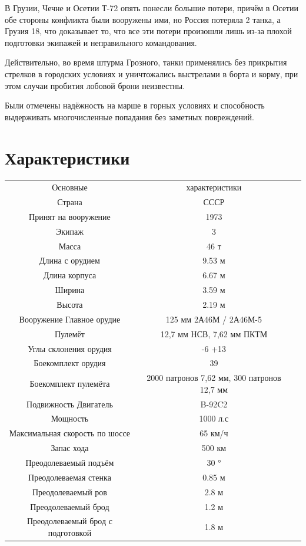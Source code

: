 В Грузии, Чечне и Осетии Т-72 опять понесли большие потери, причём в Осетии обе стороны конфликта были вооружены ими, но Россия потеряла 2 танка, а Грузия 18, что доказывает то, что все эти потери произошли лишь из-за плохой подготовки экипажей и неправильного командования.

Действительно, во время штурма Грозного, танки применялись без прикрытия стрелков в городских условиях и уничтожались выстрелами в борта и корму, при этом случаи пробития лобовой брони неизвестны.

Были отмечены надёжность на марше в горных условиях и способность выдерживать многочисленные попадания без заметных повреждений.

\section{Характеристики}

\begin{center}
\begin{tabular}{ccc}
	Основные & характеристики \\
	Страна & СССР \\
	Принят на вооружение & 1973 \\
	Экипаж & 3 \\
	Масса &	46 т \\
	Длина с орудием & 9.53 м \\
	Длина корпуса & 6.67 м \\
	Ширина & 3.59 м \\
	Высота & 2.19 м \\
	Вооружение Главное орудие & 125 мм 2А46М / 2А46М-5 \\
	Пулемёт & 12,7 мм НСВ, 7,62 мм ПКТМ \\
	Углы склонения орудия & -6 +13 \\
	Боекомплект орудия & 39 \\
	Боекомплект пулемёта & 2000 патронов 7,62 мм, 300 патронов 12,7 мм \\
	Подвижность Двигатель & B-92C2 \\
	Мощность & 1000 л.с \\
	Максимальная скорость по шоссе & 65 км/ч \\
	Запас хода & 500 км \\
	Преодолеваемый подъём & 30 ° \\
	Преодолеваемая стенка & 0.85 м \\
	Преодолеваемый ров & 2.8 м \\
	Преодолеваемый брод & 1.2 м \\
	Преодолеваемый брод с подготовкой & 1.8 м \\
\end{tabular}
\end{center}

